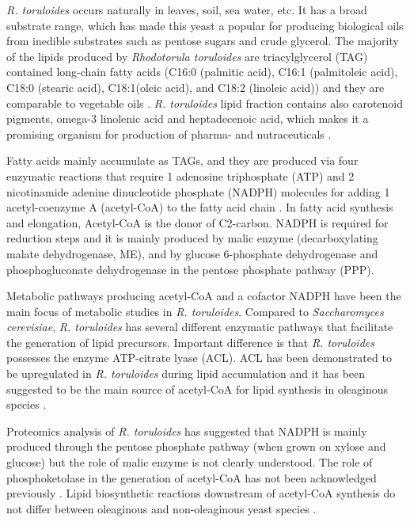 \textit{R. toruloides} occurs naturally in leaves, soil, sea water, etc. It has a broad substrate range, 
which has made this yeast a popular for producing biological oils from inedible 
substrates such as pentose sugars and crude glycerol. 
The majority of the lipids produced by \textit{Rhodotorula toruloides} are
triacylglycerol (TAG) contained long-chain fatty acids (C16:0 
(palmitic acid), C16:1 (palmitoleic acid), C18:0 (stearic acid), C18:1(oleic acid), and C18:2 (linoleic acid)) and they
are comparable to vegetable oils \cite{Li2007, Vasconcelos2019}.
\textit{R. toruloides} lipid fraction contains also carotenoid pigments, 
omega-3 linolenic acid and heptadecenoic acid,
which makes it a promising organism for production of pharma- and nutraceuticals \cite{Buzzini2007}. 

Fatty acids mainly accumulate as TAGs, and they are
produced via four enzymatic reactions that require 1 adenosine triphosphate (ATP) and 2 nicotinamide adenine dinucleotide phosphate (NADPH) molecules for adding 1 acetyl-coenzyme A 
(acetyl-CoA) to the fatty acid chain \cite{Lian2015}. In fatty acid synthesis and elongation, Acetyl-CoA is the donor of C2-carbon.
NADPH is required for reduction steps and it is mainly produced by malic enzyme (decarboxylating malate dehydrogenase, ME), 
and by glucose 6-phosphate dehydrogenase and phosphogluconate dehydrogenase in the pentose phosphate pathway (PPP). \cite{Tehlivets2007}

Metabolic pathways producing acetyl-CoA and a cofactor NADPH have been the main focus of metabolic studies in \textit{R. toruloides}. Compared to \textit{Saccharomyces cerevisiae}, \textit{R. toruloides} has several different enzymatic pathways that facilitate the generation of lipid precursors. Important difference is that \textit{R. toruloides} possesses the enzyme ATP-citrate lyase (ACL). ACL has been demonstrated to be upregulated in \textit{R. toruloides} during lipid accumulation \cite{Zhu2012} and it has been suggested to be the main source of acetyl-CoA for lipid synthesis in oleaginous species \cite{Vorapreeda2012}.

Proteomics analysis of \textit{R. toruloides} has suggested that NADPH is mainly produced through the pentose phosphate pathway (when grown on xylose and glucose) but the role of malic enzyme is not clearly understood. The role of phosphoketolase in the generation of acetyl-CoA has not been acknowledged previously \cite{Zhu2012}. Lipid biosynthetic reactions downstream of acetyl-CoA synthesis do not differ between oleaginous and non-oleaginous yeast species \cite{Tiukova2019}.


